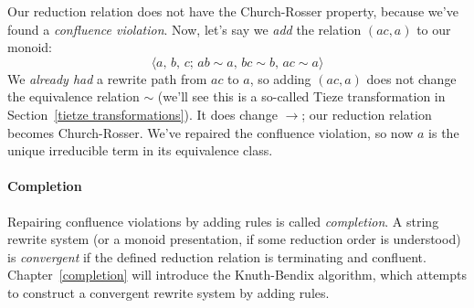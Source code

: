 \documentclass[../generics]{subfiles}
\begin{document}
\begin{example}
\begin{quote}
\begin{tikzcd}
\end{tikzcd}
\end{quote}
Our reduction relation does not have the Church-Rosser property, because we've found a \emph{confluence violation}. Now, let's say we \emph{add} the relation $(ac,a)$ to our monoid:
\[\langle a,\,b,\,c;\,ab\sim a,\,bc\sim b,\,ac\sim a\rangle\]
We \emph{already had} a rewrite path from $ac$ to $a$, so adding $(ac, a)$ does not change the equivalence relation $\sim$ (we'll see this is a so-called Tieze transformation in Section~\ref{tietze transformations}). It does change $\rightarrow$; our reduction relation becomes Church-Rosser. We've repaired the confluence violation, so now $a$ is the unique irreducible term in its equivalence class.
\end{example}
\paragraph{Completion} Repairing confluence violations by adding rules is called \emph{completion}. A string rewrite system (or a monoid presentation, if some reduction order is understood) is \emph{convergent} if the defined reduction relation is terminating and confluent. Chapter~\ref{completion} will introduce the Knuth-Bendix algorithm, which attempts to construct a convergent rewrite system by adding rules.
\end{document}
